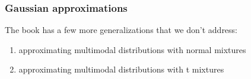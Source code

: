 \documentclass{beamer}
\begin{document}
% 
% 

% 
% 


\begin{frame}[fragile]
\frametitle{Gaussian approximations}

The book has a few more generalizations that we don't address:

\begin{enumerate}
\item approximating multimodal distributions with normal mixtures
\item approximating multimodal distributions with t mixtures
\end{enumerate}

\end{frame}
\end{document}
